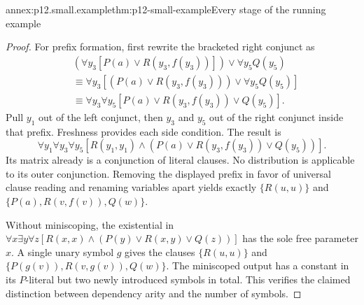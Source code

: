 \begin{annexitem}{annex:p12.small.example}{thm:p12-small-example}{Every stage of the running example}
\begin{proof}
For prefix formation, first rewrite the bracketed right conjunct as
\[
\begin{aligned}
 &(\forall y_3[P(a)\lor R(y_3,f(y_3))])\lor\forall y_5Q(y_5)\\
 &\equiv\forall y_3[(P(a)\lor R(y_3,f(y_3)))\lor\forall y_5Q(y_5)]\\
 &\equiv\forall y_3\forall y_5[P(a)\lor R(y_3,f(y_3))\lor Q(y_5)].
\end{aligned}
\]
Pull \(y_1\) out of the left conjunct, then \(y_3\) and
\(y_5\) out of the right conjunct inside that prefix. Freshness
provides each side condition. The result is
\[
 \forall y_1\forall y_3\forall y_5
 [R(y_1,y_1)\land(P(a)\lor R(y_3,f(y_3))\lor Q(y_5))].
\]
Its matrix already is a conjunction of literal clauses. No
distribution is applicable to its outer conjunction. Removing
the displayed prefix in favor of universal clause reading and
renaming variables apart yields exactly
\(\{R(u,u)\}\) and \(\{P(a),R(v,f(v)),Q(w)\}\).

Without miniscoping, the existential in
\(\forall x\exists y\forall z
[R(x,x)\land(P(y)\lor R(x,y)\lor Q(z))]\)
has the sole free parameter \(x\). A single unary symbol \(g\)
gives the clauses
\(\{R(u,u)\}\) and
\(\{P(g(v)),R(v,g(v)),Q(w)\}\).
The miniscoped output has a constant in its \(P\)-literal but
two newly introduced symbols in total. This verifies the claimed
distinction between dependency arity and the number of symbols.
\end{proof}
\end{annexitem}

